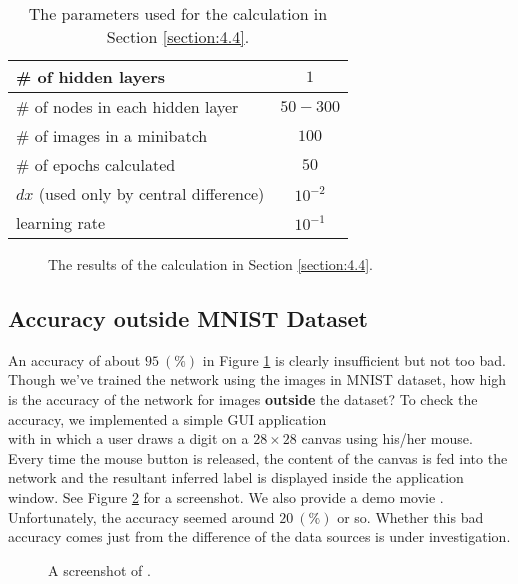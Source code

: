 \documentclass{article}
\theoremstyle{definition}
\newcommand{\sect}[1]{Section \ref{section:#1}}
\newcommand{\fig}[1]{Figure \ref{fig:#1}}
\begin{document}
\begin{table}[H]
    \centering
    \begin{tabular}{|l|c|} \hline
    \# of hidden layers & $1$ \\ \hline
    \# of nodes in each hidden layer & $50 - 300$ \\ \hline
    \# of images in a minibatch & $100$ \\ \hline
    \# of epochs calculated & $50$ \\ \hline
    $dx$ (used only by central difference) & $10^{-2}$ \\ \hline
    learning rate & $10^{-1}$ \\ \hline
    \end{tabular}
    \caption{The parameters used for the calculation in \sect{4.4}.}
    \label{tab:4.3}
\end{table}

\begin{figure}[H]
    \centering
    \begin{subfigure}[H]{1.0\textwidth}
	\end{subfigure}
    \caption{The results of the calculation in \sect{4.4}.}
    \label{fig:4.4}
\end{figure}

\subsection{Accuracy outside MNIST Dataset}

An accuracy of about $95\ (\%)$ in \fig{4.4} is clearly insufficient but not too bad. Though we've trained the network using the images in MNIST dataset, how high is the accuracy of the network for images {\bf outside} the dataset? To check the accuracy, we implemented a simple GUI application \\ with  in which a user draws a digit on a $28 \times 28$ canvas using his/her mouse. Every time the mouse button is released, the content of the canvas is fed into the network and the resultant inferred label is displayed inside the application window. See \fig{4.5} for a screenshot. We also provide a demo movie . Unfortunately, the accuracy seemed around $20\ (\%)$ or so. Whether this bad accuracy comes just from the difference of the data sources is under investigation.

\begin{figure}[H]
    \centering
    \begin{subfigure}[H]{1.0\textwidth}
	\end{subfigure}
    \caption{A screenshot of .}
    \label{fig:4.5}
\end{figure}
\end{document}
